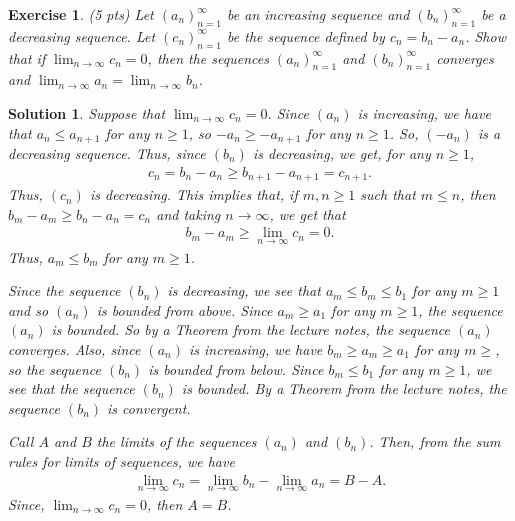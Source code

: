 \documentclass[12pt]{article}
\newcommand{\ra}{\rightarrow}
\theoremstyle{plain}
\newtheorem{exer}{\textbf{Exercise}}}
\theoremstyle{plain}
\newtheorem*{sol}{\textbf{Solution}}}
\begin{document}

\begin{exer}
(5 pts)
Let $(a_n)_{n = 1}^\infty$ be an increasing sequence and $(b_n)_{n = 1}^\infty$ be a decreasing sequence. Let $(c_n)_{n = 1}^\infty$ be the sequence defined by $c_n = b_n - a_n$. Show that if $\lim_{n \ra \infty} c_n = 0$, then the sequences $(a_n)_{n = 1}^\infty$ and $(b_n)_{n = 1}^\infty$ converges and $\lim_{n \ra \infty} a_n = \lim_{n \ra \infty} b_n$.
\end{exer}
\begin{sol}
Suppose that $\lim_{n\ra \infty} c_n = 0$. Since $(a_n)$ is increasing, we have that $a_n \leq a_{n + 1}$ for any $n \geq 1$, so $-a_n \geq -a_{n + 1}$ for any $n \geq 1$. So, $(-a_n)$ is a decreasing sequence. Thus, since $(b_n)$ is decreasing, we get, for any $n \geq 1$,
	\begin{align*}
	c_n = b_n - a_n \geq b_{n + 1} - a_{n + 1} = c_{n + 1} .
	\end{align*}
Thus, $(c_n)$ is decreasing. This implies that, if $m, n \geq 1$ such that $m \leq n$, then $b_m - a_m \geq b_n - a_n = c_n$ and taking $n \ra \infty$, we get that
	\begin{align*}
	b_m - a_m \geq \lim_{n \ra \infty} c_n = 0 .
	\end{align*}
Thus, $a_m \leq b_m$ for any $m \geq 1$.

Since the sequence $(b_n)$ is decreasing, we see that $a_m \leq b_m \leq b_1$ for any $m \geq 1$ and so $(a_n)$ is bounded from above. Since $a_m \geq a_1$ for any $m \geq 1$, the sequence $(a_n)$ is bounded. So by a Theorem from the lecture notes, the sequence $(a_n)$ converges. Also, since $(a_n)$ is increasing, we have $b_m \geq a_m \geq a_1$ for any $m \geq$, so the sequence $(b_n)$ is bounded from below. Since $b_m \leq b_1$ for any $m \geq 1$, we see that the sequence $(b_n)$ is bounded. By a Theorem from the lecture notes, the sequence $(b_n)$ is convergent.

Call $A$ and $B$ the limits of the sequences $(a_n)$ and $(b_n)$. Then, from the sum rules for limits of sequences, we have
	\begin{align*}
	\lim_{n \ra \infty} c_n = \lim_{n \ra \infty} b_n - \lim_{n \ra \infty} a_n = B - A .
	\end{align*}
Since, $\lim_{n \ra \infty} c_n = 0$, then $A = B$.
\end{sol}
\end{document}
